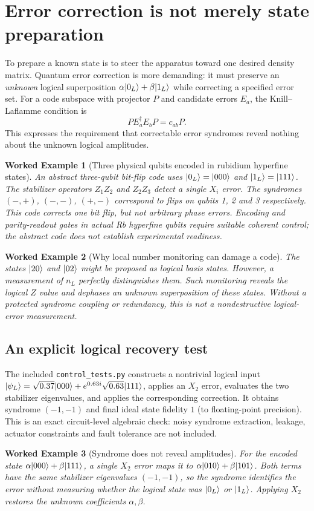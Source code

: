 \documentclass[11pt,a4paper]{article}
\newtheorem{example}{Worked Example}\newtheorem{remark}{Qualification}\newtheorem{proposition}{Proposition}
\begin{document}
\section{Error correction is not merely state preparation}
To prepare a known state is to steer the apparatus toward one desired density matrix. Quantum error correction is more demanding: it must preserve an \emph{unknown} logical superposition $\alpha|0_L\rangle+\beta|1_L\rangle$ while correcting a specified error set.
For a code subspace with projector $P$ and candidate errors $E_a$, the Knill--Laflamme condition is
\begin{equation}\label{eq:KL}\boxed{PE_a^\dagger E_bP=c_{ab}P.}\end{equation}
This expresses the requirement that correctable error syndromes reveal nothing about the unknown logical amplitudes.
\begin{example}[Three physical qubits encoded in rubidium hyperfine states]
An abstract three-qubit bit-flip code uses $|0_L\rangle=|000\rangle$ and $|1_L\rangle=|111\rangle$. The stabilizer operators $Z_1Z_2$ and $Z_2Z_3$ detect a single $X_i$ error. The syndromes $(-,+)$, $(-,-)$, $(+,-)$ correspond to flips on qubits 1, 2 and 3 respectively. This code corrects one bit flip, but not arbitrary phase errors. Encoding and parity-readout gates in actual Rb hyperfine qubits require suitable coherent control; the abstract code does not establish experimental readiness.
\end{example}
\begin{example}[Why local number monitoring can damage a code]
The states $|20\rangle$ and $|02\rangle$ might be proposed as logical basis states. However, a measurement of $n_L$ perfectly distinguishes them. Such monitoring reveals the logical $Z$ value and dephases an unknown superposition of these states. Without a protected syndrome coupling or redundancy, this is not a nondestructive logical-error measurement.
\end{example}

\subsection{An explicit logical recovery test}
The included \texttt{control\_tests.py} constructs a nontrivial logical input $|\psi_L\rangle=\sqrt{0.37}|000\rangle+e^{0.63i}\sqrt{0.63}|111\rangle$, applies an $X_2$ error, evaluates the two stabilizer eigenvalues, and applies the corresponding correction. It obtains syndrome $(-1,-1)$ and final ideal state fidelity $1$ (to floating-point precision). This is an exact circuit-level algebraic check: noisy syndrome extraction, leakage, actuator constraints and fault tolerance are not included.
\begin{example}[Syndrome does not reveal amplitudes]
For the encoded state $\alpha|000\rangle+\beta|111\rangle$, a single $X_2$ error maps it to $\alpha|010\rangle+\beta|101\rangle$. Both terms have the same stabilizer eigenvalues $(-1,-1)$, so the syndrome identifies the error without measuring whether the logical state was $|0_L\rangle$ or $|1_L\rangle$. Applying $X_2$ restores the unknown coefficients $\alpha,\beta$.
\end{example}
\end{document}
